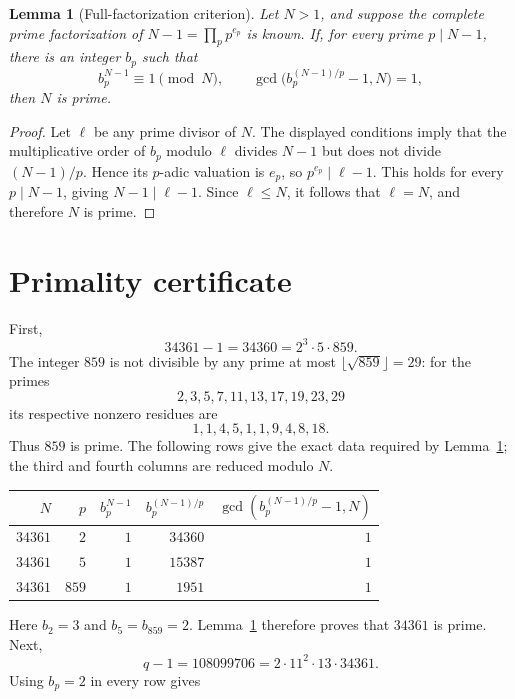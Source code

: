 \documentclass[11pt]{article}
\newtheorem{lemma}[theorem]{Lemma}
\begin{document}
\begin{lemma}[Full-factorization criterion]\label{lem:criterion}
Let $N>1$, and suppose the complete prime factorization of
$N-1=\prod_p p^{e_p}$ is known.  If, for every prime $p\mid N-1$, there is an
integer $b_p$ such that
\[
b_p^{N-1}\equiv1\pmod N,
\qquad
\gcd\bigl(b_p^{(N-1)/p}-1,N\bigr)=1,
\]
then $N$ is prime.
\end{lemma}

\begin{proof}
Let $\ell$ be any prime divisor of $N$.  The displayed conditions imply that
the multiplicative order of $b_p$ modulo $\ell$ divides $N-1$ but does not
divide $(N-1)/p$.  Hence its $p$-adic valuation is $e_p$, so
$p^{e_p}\mid\ell-1$.  This holds for every $p\mid N-1$, giving
$N-1\mid\ell-1$.  Since $\ell\leq N$, it follows that $\ell=N$, and therefore
$N$ is prime.
\end{proof}

\section{Primality certificate}

First,
\[
34361-1=34360=2^3\cdot5\cdot859.
\]
The integer $859$ is not divisible by any prime at most
$\lfloor\sqrt{859}\rfloor=29$: for the primes
\[
2,3,5,7,11,13,17,19,23,29
\]
its respective nonzero residues are
\[
1,1,4,5,1,1,9,4,8,18.
\]
Thus $859$ is prime.  The following rows give the exact data required by
Lemma~\ref{lem:criterion}; the third and fourth columns are reduced modulo
$N$.

\begin{center}
\begin{tabular}{rrrrr}
\toprule
$N$ & $p$ & $b_p^{N-1}$ & $b_p^{(N-1)/p}$ &
$\gcd(b_p^{(N-1)/p}-1,N)$ \\
\midrule
$34361$ & $2$   & $1$ & $34360$ & $1$ \\
$34361$ & $5$   & $1$ & $15387$ & $1$ \\
$34361$ & $859$ & $1$ & $1951$  & $1$ \\
\bottomrule
\end{tabular}
\end{center}
Here $b_2=3$ and $b_5=b_{859}=2$.  Lemma~\ref{lem:criterion} therefore
proves that $34361$ is prime.  Next,
\[
q-1=108099706=2\cdot11^2\cdot13\cdot34361.
\]
Using $b_p=2$ in every row gives
\end{document}
